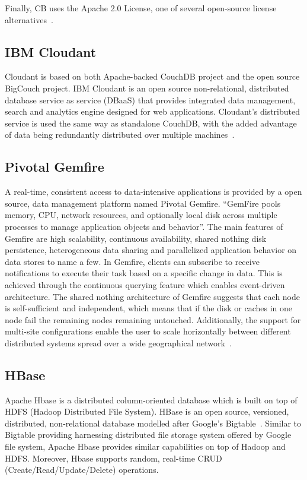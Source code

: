 Finally, CB uses the Apache 2.0 License, one of several open-source
license alternatives~\cite{www-quora-cbs}.


     \pv

\subsection{IBM Cloudant}
     
Cloudant is based on both Apache-backed CouchDB project and the open
source BigCouch project. IBM Cloudant is an open source
non-relational, distributed database service as service (DBaaS) that
provides integrated data management, search and analytics engine
designed for web applications. Cloudant's distributed service is used
the same way as standalone CouchDB, with the added advantage of data
being redundantly distributed over multiple
machines~\cite{www-ibm-cloudant}.
   

\subsection{Pivotal Gemfire}
     
A real-time, consistent access to data-intensive applications is
provided by a open source, data management platform named Pivotal
Gemfire. ``GemFire pools memory, CPU, network resources, and
optionally local disk across multiple processes to manage application
objects and behavior''. The main features of Gemfire are high
scalability, continuous availability, shared nothing disk persistence,
heterogeneous data sharing and parallelized application behavior on
data stores to name a few.  In Gemfire, clients can subscribe to
receive notifications to execute their task based on a specific change
in data. This is achieved through the continuous querying feature
which enables event-driven architecture. The shared nothing
architecture of Gemfire suggests that each node is self-sufficient and
independent, which means that if the disk or caches in one node fail
the remaining nodes remaining untouched. Additionally, the support for
multi-site configurations enable the user to scale horizontally
between different distributed systems spread over a wide geographical
network~\cite{www-gemfire}.
     
\subsection{HBase}

Apache Hbase is a distributed column-oriented database which is built
on top of HDFS (Hadoop Distributed File System). HBase is an open
source, versioned, distributed, non-relational database modelled after
Google's Bigtable~\cite{www-hbase}. Similar to Bigtable providing
harnessing distributed file storage system offered by Google file
system, Apache Hbase provides similar capabilities on top of Hadoop
and HDFS. Moreover, Hbase supports random, real-time CRUD
(Create/Read/Update/Delete) operations.

